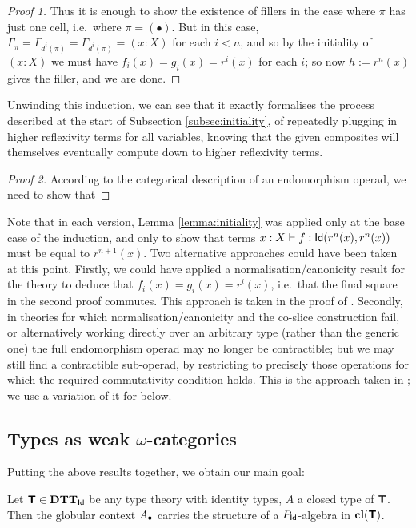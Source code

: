 \begin{proof}[Proof 1]
Thus it is enough to show the existence of fillers in the case where $\pi$ has just one cell, i.e.\ where $\pi = ( \bullet )$.  But in this case, $\Gamma_\pi = \Gamma_{d^i(\pi)} = \Gamma_{d^i(\pi)} = (x:X)$ for each $i < n$, and so by the initiality of $(x:X)$ we must have $f_i(x) = g_i(x) = r^i(x)$ for each $i$; so now $h := r^n(x)$ gives the filler, and we are done.
\end{proof}

Unwinding this induction, we can see that it exactly formalises the process described at the start of Subsection \ref{subsec:initiality}, of repeatedly plugging in higher reflexivity terms for all variables, knowing that the given composites will themselves eventually compute down to higher reflexivity terms.

\begin{proof}[Proof 2]
According to the categorical description of an endomorphism operad, we need to show that 
\end{proof}

Note that in each version, Lemma \ref{lemma:initiality} was applied only at the base case of the induction, and only to show that terms $x:X \vdash f: \mathsf{Id}(r^n(x),r^n(x))$ must be equal to $r^{n+1}(x)$.  Two alternative approaches could have been taken at this point.  Firstly, we could have applied a normalisation/canonicity result for the theory to deduce that $f_i(x) = g_i(x) = r^i(x)$, i.e.\ that the final square in the second proof commutes. This approach is taken in the proof of \label{thm:ctrble-operad-for-id}.  Secondly, in theories for which normalisation/canonicity and the co-slice construction fail, or alternatively working directly over an arbitrary type (rather than the generic one) the full endomorphism operad may no longer be contractible; but we may still find a contractible sub-operad, by restricting to precisely those operations for which the required commutativity condition holds.  This is the approach taken in \cite{garner-van-den-berg}; we use a variation of it for \label{thm:ctrble-operad-for-piidelim} below.

\subsection*{Types as weak \texorpdfstring{$\omega$}{omega}-categories} \label{subsec:payoff}

Putting the above results together, we obtain our main goal:

\begin{theorem}Let $\textbf{\textsf{T}} \in \mathbf{DTT}_{\mathsf{Id}}$ be any type theory with identity types, $A$ a closed type of $\textbf{\textsf{T}}$.  Then the globular context $A_\bullet$ carries the structure of a $P_{\mathsf{Id}}$-algebra in $\mathbf{cl}(\textbf{\textsf{T}})$.
\end{theorem}

